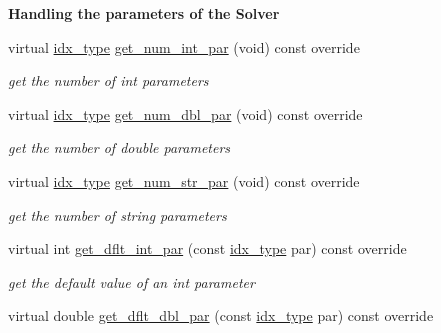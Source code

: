 \begin{Indent}\textbf{ Handling the parameters of the Solver}\par
\begin{DoxyCompactItemize}
\item 
virtual \mbox{\hyperlink{class_s_m_spp__di__unipi__it_1_1_thin_compute_interface_aa3d710629ad8c434286726ad810c3b47}{idx\+\_\+type}} \mbox{\hyperlink{class_s_m_spp__di__unipi__it_1_1_solver_a3ad74d9506761eb2ca4c8a936fb7a1c5}{get\+\_\+num\+\_\+int\+\_\+par}} (void) const override
\begin{DoxyCompactList}\small\item\em get the number of int parameters \end{DoxyCompactList}\item 
virtual \mbox{\hyperlink{class_s_m_spp__di__unipi__it_1_1_thin_compute_interface_aa3d710629ad8c434286726ad810c3b47}{idx\+\_\+type}} \mbox{\hyperlink{class_s_m_spp__di__unipi__it_1_1_solver_a842fd454acaded84baf6b77e0d61a950}{get\+\_\+num\+\_\+dbl\+\_\+par}} (void) const override
\begin{DoxyCompactList}\small\item\em get the number of double parameters \end{DoxyCompactList}\item 
virtual \mbox{\hyperlink{class_s_m_spp__di__unipi__it_1_1_thin_compute_interface_aa3d710629ad8c434286726ad810c3b47}{idx\+\_\+type}} \mbox{\hyperlink{class_s_m_spp__di__unipi__it_1_1_solver_a91f0341f09d59b3023fc95122a625125}{get\+\_\+num\+\_\+str\+\_\+par}} (void) const override
\begin{DoxyCompactList}\small\item\em get the number of string parameters \end{DoxyCompactList}\item 
virtual int \mbox{\hyperlink{class_s_m_spp__di__unipi__it_1_1_solver_a75dd1491b74c4b9476755e061dce3e04}{get\+\_\+dflt\+\_\+int\+\_\+par}} (const \mbox{\hyperlink{class_s_m_spp__di__unipi__it_1_1_thin_compute_interface_aa3d710629ad8c434286726ad810c3b47}{idx\+\_\+type}} par) const override
\begin{DoxyCompactList}\small\item\em get the default value of an int parameter \end{DoxyCompactList}\item 
virtual double \mbox{\hyperlink{class_s_m_spp__di__unipi__it_1_1_solver_a465a771c115acf8d5f4e32e22f003014}{get\+\_\+dflt\+\_\+dbl\+\_\+par}} (const \mbox{\hyperlink{class_s_m_spp__di__unipi__it_1_1_thin_compute_interface_aa3d710629ad8c434286726ad810c3b47}{idx\+\_\+type}} par) const override

\end{DoxyCompactItemize}
\end{Indent}
